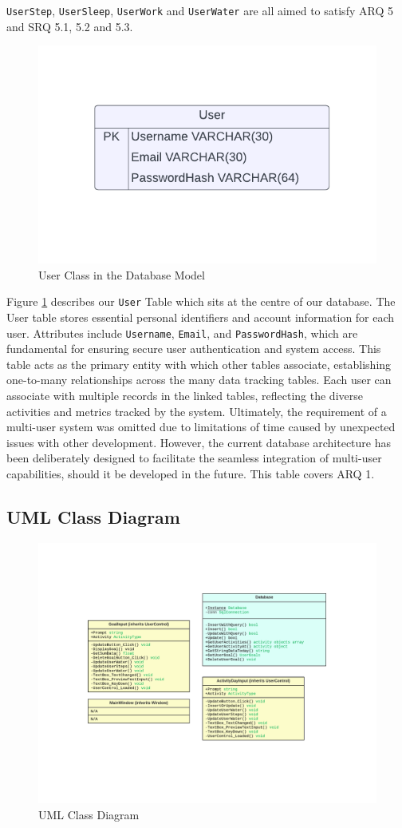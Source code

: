 \documentclass[11pt]{article}
\begin{document}
\texttt{UserStep}, \texttt{UserSleep}, \texttt{UserWork} and \texttt{UserWater}
are all aimed to satisfy ARQ 5 and SRQ 5.1, 5.2 and 5.3.

\begin{figure}[!ht]
  \centering
  \includegraphics[width = 0.4\linewidth]{PI Systems Database-2}
  \caption{User Class in the Database Model}
  \label{fig:User_Table}
\end{figure}

Figure \ref{fig:User_Table} describes our \texttt{User} Table which sits at the centre of our database. 
The User table stores essential personal identifiers and account information for each user. Attributes include \texttt{Username}, \texttt{Email}, and
\texttt{PasswordHash}, which are fundamental for ensuring secure user authentication and
system access. This table acts as the primary entity with which other tables
associate, establishing one-to-many relationships across the many data tracking
tables. Each user can associate with multiple records in the
linked tables, reflecting the diverse activities and metrics tracked by the
system. Ultimately, the requirement of a multi-user system was omitted due to
limitations of time caused by unexpected issues with other development. However, the current database
architecture has been deliberately designed to facilitate the seamless
integration of multi-user capabilities, should it be developed in the future.
This table covers ARQ 1.

\subsection{UML Class Diagram}

\begin{figure}[!ht]
  \centering
  \includegraphics[width = 0.7\linewidth]{UML Class diagram}
  \caption{UML Class Diagram}
  \label{fig:Class}
\end{figure}
\end{document}
